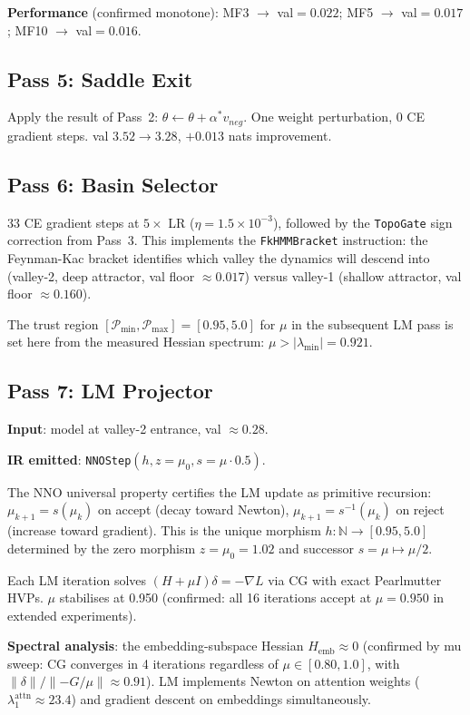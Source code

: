 \documentclass[11pt]{amsart}
\begin{document}
\textbf{Performance} (confirmed monotone):
MF3 $\to$ val${=}0.022$;
MF5 $\to$ val${=}0.017$;
MF10 $\to$ val${=}0.016$.

\subsection{Pass 5: Saddle Exit}

Apply the result of Pass~2: $\theta \leftarrow \theta + \alpha^* v_{neg}$.
One weight perturbation, 0 CE gradient steps.
val $3.52 \to 3.28$, $+0.013$ nats improvement.

\subsection{Pass 6: Basin Selector}

33 CE gradient steps at $5\times$ LR ($\eta = 1.5 \times 10^{-3}$),
followed by the \texttt{TopoGate} sign correction from Pass~3.
This implements the \texttt{FkHMMBracket} instruction:
the Feynman-Kac bracket identifies which valley the dynamics
will descend into (valley-2, deep attractor, val floor $\approx 0.017$)
versus valley-1 (shallow attractor, val floor $\approx 0.160$).

The trust region $[\mathcal{P}_{\min}, \mathcal{P}_{\max}] = [0.95, 5.0]$
for $\mu$ in the subsequent LM pass is set here from the
measured Hessian spectrum: $\mu > |\lambda_{\min}| = 0.921$.

\subsection{Pass 7: LM Projector}

\textbf{Input}: model at valley-2 entrance, val $\approx 0.28$.

\textbf{IR emitted}: \texttt{NNOStep}$(h, z=\mu_0, s=\mu \cdot 0.5)$.

The NNO universal property certifies the LM update as
primitive recursion:
$\mu_{k+1} = s(\mu_k)$ on accept (decay toward Newton),
$\mu_{k+1} = s^{-1}(\mu_k)$ on reject (increase toward gradient).
This is the unique morphism $h: \mathbb{N} \to [0.95, 5.0]$
determined by the zero morphism $z = \mu_0 = 1.02$
and successor $s = \mu \mapsto \mu/2$.

Each LM iteration solves $(H + \mu I)\delta = -\nabla L$
via CG with exact Pearlmutter HVPs.
$\mu$ stabilises at 0.950 (confirmed: all 16 iterations
accept at $\mu = 0.950$ in extended experiments).

\textbf{Spectral analysis}: the embedding-subspace Hessian
$H_{\text{emb}} \approx 0$ (confirmed by mu sweep: CG converges
in 4 iterations regardless of $\mu \in [0.80, 1.0]$,
with $\|\delta\| / \|{-G/\mu}\| \approx 0.91$).
LM implements Newton on attention weights
($\lambda_1^{\text{attn}} \approx 23.4$) and gradient descent
on embeddings simultaneously.
\end{document}
